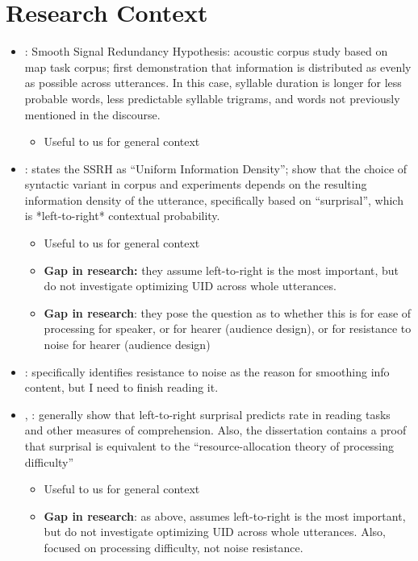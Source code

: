 \documentclass[11pt]{article}
\begin{document}
\section{Research Context}
\begin{itemize}
	\item \citet{aylettturk2004}: Smooth Signal Redundancy Hypothesis: acoustic corpus study based on map task corpus; first demonstration that information is distributed as evenly as possible across utterances. In this case, syllable duration is longer for less probable words, less predictable syllable trigrams, and words not previously mentioned in the discourse.
	\begin{itemize}
		\item Useful to us for general context
	\end{itemize}
	\item \citet{levyjaeger2007}: states the SSRH as ``Uniform Information Density''; show that the choice of syntactic variant in corpus and experiments depends on the resulting information density of the utterance, specifically based on ``surprisal'', which is *left-to-right* contextual probability.
	\begin{itemize}
		\item Useful to us for general context
		\item \textbf{Gap in research:} they assume left-to-right is the most important, but do not investigate optimizing UID across whole utterances.
		\item \textbf{Gap in research}: they pose the question as to whether this is for ease of processing for speaker, or for hearer (audience design), or for resistance to noise for hearer (audience design)
	\end{itemize}
	\item \citet{levy2008a}: specifically identifies resistance to noise as the reason for smoothing info content, but I need to finish reading it.
	\item \citet{levy2005, levy2008}, \citet{smithlevy2013}: generally show that left-to-right surprisal predicts rate in reading tasks and other measures of comprehension. Also, the dissertation contains a proof that surprisal is equivalent to the ``resource-allocation theory of processing difficulty''
	\begin{itemize}
		\item Useful to us for general context
		\item \textbf{Gap in research}: as above, assumes left-to-right is the most important, but do not investigate optimizing UID across whole utterances. Also, focused on processing difficulty, not noise resistance.

\end{itemize}
\end{itemize}
\end{document}
